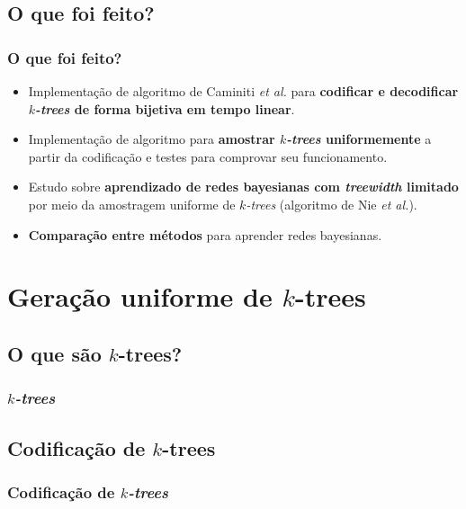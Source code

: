 \documentclass{beamer}
\begin{document}
  \subsection{O que foi feito?}

  \begin{frame}
    \frametitle{O que foi feito?}

    \begin{itemize}
      \item Implementação de algoritmo de Caminiti \emph{et al.} para \textbf{codificar e decodificar \emph{$k$-trees} de forma bijetiva em tempo linear}.
      \item Implementação de algoritmo para \textbf{amostrar \emph{$k$-trees} uniformemente} a partir da codificação e testes para comprovar seu funcionamento.
      \item Estudo sobre \textbf{aprendizado de redes bayesianas com \emph{treewidth} limitado} por meio da amostragem uniforme de \emph{$k$-trees} (algoritmo de Nie \emph{et al.}).
      \item \textbf{Comparação entre métodos} para aprender redes bayesianas.
    \end{itemize}
  \end{frame}


  \section{Geração uniforme de $k$-trees}

  \subsection{O que são $k$-trees?}

  \begin{frame}
    \frametitle{\emph{$k$-trees}}

  \end{frame}

  \subsection{Codificação de $k$-trees}

  \begin{frame}
    \frametitle{Codificação de \emph{$k$-trees}}

  \end{frame}
\end{document}
